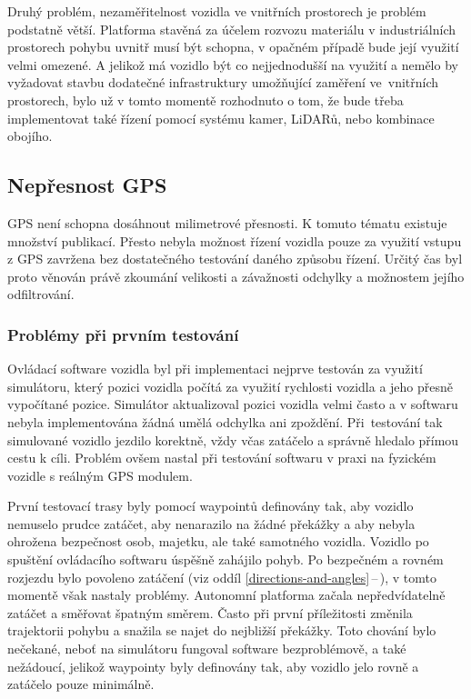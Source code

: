 \documentclass[czech, bachelor]{diploma}
\newcommand{\peteref}[1]{\ref{#1}\,--\,\nameref{#1}}
\begin{document}
Druhý problém, nezaměřitelnost vozidla ve vnitřních prostorech je problém podstatně větší. Platforma stavěná za účelem rozvozu
materiálu v industriálních prostorech pohybu uvnitř musí být schopna, v opačném případě bude její využití velmi omezené. A jelikož
má vozidlo být co nejjednodušší na využití a nemělo by vyžadovat stavbu dodatečné infrastruktury umožňující zaměření ve~vnitřních
prostorech, bylo už v tomto momentě rozhodnuto o tom, že bude třeba implementovat také řízení pomocí systému kamer, LiDARů, nebo
kombinace obojího.

\subsection{Nepřesnost GPS} \label{gps-inaccuracy}

GPS není schopna dosáhnout milimetrové přesnosti. K tomuto tématu existuje množství publikací\cite{gps-inaccuracy-source}. Přesto
nebyla možnost řízení vozidla pouze za využití vstupu z GPS zavržena bez dostatečného testování daného způsobu řízení. Určitý čas
byl proto věnován právě zkoumání velikosti a závažnosti odchylky a možnostem jejího odfiltrování.

\subsubsection{Problémy při prvním testování}

Ovládací software vozidla byl při implementaci nejprve testován za využití simulátoru, který pozici vozidla počítá za využití
rychlosti vozidla a jeho přesně vypočítané pozice. Simulátor aktualizoval pozici vozidla velmi často a v softwaru nebyla
implementována žádná umělá odchylka ani zpoždění. Při~testování tak simulované vozidlo jezdilo korektně, vždy včas zatáčelo a
správně hledalo přímou cestu k cíli. Problém ovšem nastal při testování softwaru v praxi na fyzickém vozidle s reálným GPS
modulem.

První testovací trasy byly pomocí waypointů definovány tak, aby vozidlo nemuselo prudce zatáčet, aby nenarazilo na žádné překážky
a aby nebyla ohrožena bezpečnost osob, majetku, ale také samotného vozidla. Vozidlo po spuštění ovládacího softwaru úspěšně
zahájilo pohyb. Po bezpečném a rovném rozjezdu bylo povoleno zatáčení (viz oddíl \peteref{directions-and-angles}), v tomto
momentě však nastaly problémy. Autonomní platforma začala nepředvídatelně zatáčet a směřovat špatným směrem. Často při první
příležitosti změnila trajektorii pohybu a snažila se najet do nejbližší překážky. Toto chování bylo nečekané, neboť na simulátoru
fungoval software bezproblémově, a také nežádoucí, jelikož waypointy byly definovány tak, aby vozidlo jelo rovně a zatáčelo pouze
minimálně.
\end{document}
